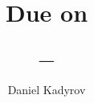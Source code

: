 \documentclass{article}
\title{
    \Title \\
    \vspace{2mm}
    \large
    Due on \DueDate \\
    \ClassName \\ 
    \ClassNumber  $-$\ClassSection \\
    \Instructor
}
\author{Daniel Kadyrov}
\date{}
\newenvironment{problem}{
    \bfseries
}
\begin{document}
\maketitle
\thispagestyle{empty}

\section{}

\begin{problem}
    This is an example of a problem statement 

\end{problem}

\subsection{}

\newpage
\begin{problem}
    problem 2
\end{problem}
\end{document}

